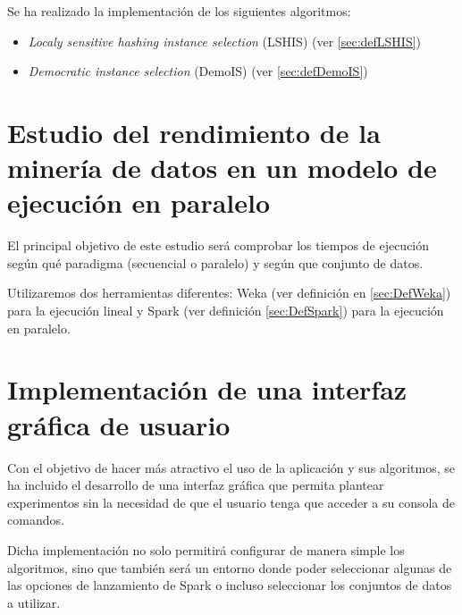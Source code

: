Se ha realizado la implementación de los siguientes algoritmos:

\begin{itemize}
	\item \textit{Localy sensitive hashing instance selection} (LSHIS) (ver \ref{sec:defLSHIS})
	\item \textit{Democratic instance selection} (DemoIS) (ver \ref{sec:defDemoIS})
\end{itemize}


\section{Estudio del rendimiento de la minería de datos en un modelo de ejecución en paralelo}

El principal objetivo de este estudio será comprobar los tiempos de ejecución según qué paradigma (secuencial o paralelo) y según que conjunto de datos.

Utilizaremos dos herramientas diferentes: Weka (ver definición en \ref{sec:DefWeka}) para la ejecución lineal y Spark (ver definición \ref{sec:DefSpark}) para la ejecución en paralelo.




\section{Implementación de una interfaz gráfica de usuario}

Con el objetivo de hacer más atractivo el uso de la aplicación y sus algoritmos, se ha incluido el desarrollo de una interfaz gráfica que permita plantear experimentos sin la necesidad de que el usuario tenga que acceder a su consola de comandos.

Dicha implementación no solo permitirá configurar de manera simple los algoritmos, sino que también será un entorno donde poder seleccionar algunas de las opciones de lanzamiento de Spark o incluso seleccionar los conjuntos de datos a utilizar.


